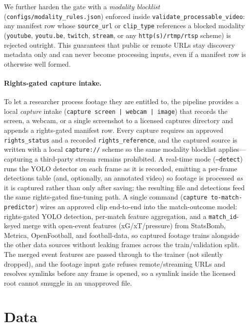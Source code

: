\documentclass[11pt]{article}
\begin{document}
We further harden the gate with a \emph{modality blocklist}
(\texttt{configs/modality\_rules.json}) enforced inside
\texttt{validate\_processable\_video}: any manifest row whose
\texttt{source\_url} or \texttt{clip\_type} references a blocked modality
(\texttt{youtube}, \texttt{youtu.be}, \texttt{twitch}, \texttt{stream}, or any
\texttt{http(s)/rtmp/rtsp} scheme) is rejected outright. This guarantees that
public or remote URLs stay discovery metadata only and can never become
processing inputs, even if a manifest row is otherwise well formed.

\paragraph{Rights-gated capture intake.} To let a researcher process footage
they are entitled to, the pipeline provides a local \emph{capture} intake
(\texttt{capture screen\,|\,webcam\,|\,image}) that records the screen, a
webcam, or a single screenshot to a licensed captures directory and appends a
rights-gated manifest row. Every capture requires an approved
\texttt{rights\_status} and a recorded \texttt{rights\_reference}, and the
captured source is written with a local \texttt{capture://} scheme so the same
modality blocklist applies---capturing a third-party stream remains prohibited.
A real-time mode (\texttt{--detect}) runs the YOLO detector on each frame as it
is recorded, emitting a per-frame detections table (and, optionally, an
 annotated video) so footage is processed \emph{as} it is captured rather than
 only after saving; the resulting file and detections feed the same
  rights-gated fine-tuning path. A single command
  (\texttt{capture to-match-predictor}) wires an approved clip end-to-end into the
  match-outcome model: rights-gated YOLO detection, per-match feature aggregation,
  and a \texttt{match\_id}-keyed merge with open-event features
  (xG/xT/pressure) from StatsBomb, Metrica, OpenFootball, and football-data, so
  captured footage trains alongside the other data sources without leaking frames
  across the train/validation split. The merged event features are passed through
  to the trainer (not silently dropped), and the footage input gate refuses
  remote/streaming URLs and resolves symlinks before any frame is opened, so a
  symlink inside the licensed root cannot smuggle in an unapproved file.



\section{Data}
\label{sec:data}
\end{document}

